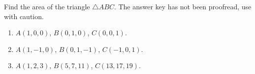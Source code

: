 Find the area of the triangle $\triangle ABC$. The answer key has not been proofread, use with caution.
\begin{enumerate}
\item $ A(1,0,0)$, $ B(0,1,0)$, $ C(0,0,1)$.
\item $ A(1,-1,0)$, $ B(0,1,-1)$, $ C(-1,0,1)$.
\item $ A(1,2,3)$, $ B(5,7,11)$, $ C(13,17,19)$.
\end{enumerate}